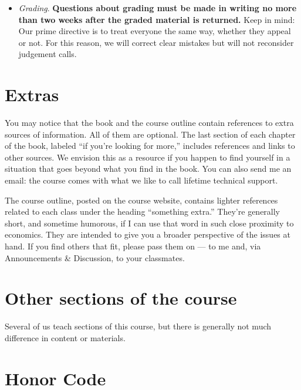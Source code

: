 \documentclass[12pt]{article}
\begin{document}
\begin{itemize}
\item \textit{Grading}.
{\bf Questions about grading must be made in writing no more than two weeks
after the graded material is returned.}
Keep in mind:  Our prime directive is to treat everyone the same way, 
whether they appeal or not.  
For this reason, we will correct clear mistakes but will not 
reconsider judgement calls.  

\end{itemize}

\section{Extras}

You may notice that the book and the course outline contain references to
extra sources of information.
All of them are optional.
The last section of each chapter of the book,
labeled ``if you're looking for more,''
includes references and links to other sources.
We envision this as a resource if you happen to find yourself in
a situation that goes beyond what you find in the book.
You can also send me an email:  the course comes with what we like
to call lifetime technical support.

The course outline, posted on the course website,
contains lighter references related to each class
under the heading ``something extra.''
They're generally short, and sometime humorous,
if I can use that word in such close proximity to economics.
They are intended
to give you a broader perspective of the issues at hand.
If you find others that fit, please pass them on ---
to me and, via Announcements \& Discussion, to your classmates.

\section{Other sections of the course}

Several of us teach sections of this course,
but there is generally not much difference in content or materials.


\section{Honor Code}
\end{document}
